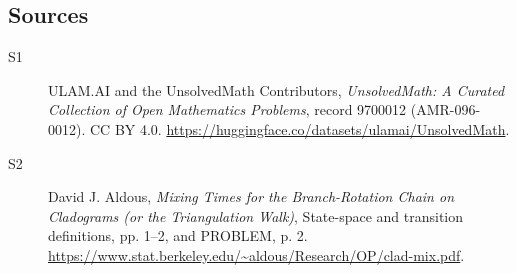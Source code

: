 \documentclass[11pt]{article}
\begin{document}
\subsection{Sources}
\begin{description}
\item[\hypertarget{source:9700012:1}{S1}] ULAM.AI and the UnsolvedMath Contributors, \emph{UnsolvedMath: A Curated Collection of Open Mathematics Problems}, record 9700012 (AMR-096-0012). CC BY 4.0. \url{https://huggingface.co/datasets/ulamai/UnsolvedMath}.
\item[\hypertarget{source:9700012:2}{S2}] David J. Aldous, \emph{Mixing Times for the Branch-Rotation Chain on Cladograms (or the Triangulation Walk)}, State-space and transition definitions, pp. 1--2, and PROBLEM, p. 2. \url{https://www.stat.berkeley.edu/~aldous/Research/OP/clad-mix.pdf}.
\end{description}
\label{end:9700012}
\end{document}

